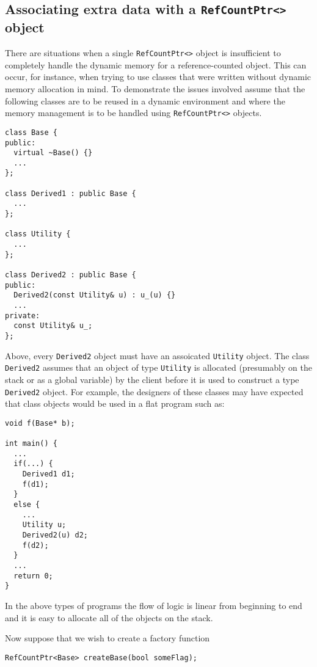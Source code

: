 %
\subsection{Associating extra data with a {}\texttt{RefCountPtr<>} object}
\label{rcp:sec:extra-data}
%

There are situations when a single {}\texttt{RefCountPtr<>} object is
insufficient to completely handle the dynamic memory for a
reference-counted object.  This can occur, for instance, when trying
to use classes that were written without dynamic memory allocation in
mind.  To demonstrate the issues involved assume that the following
classes are to be reused in a dynamic environment and where the memory
management is to be handled using {}\texttt{RefCountPtr<>} objects.

{\scriptsize\begin{verbatim}
class Base {
public:
  virtual ~Base() {}
  ...
};

class Derived1 : public Base {
  ...
};

class Utility {
  ...
};

class Derived2 : public Base {
public:
  Derived2(const Utility& u) : u_(u) {}
  ...
private:
  const Utility& u_;
};
\end{verbatim}}

{}\noindent{}Above, every {}\texttt{Derived2} object must have an
assoicated {}\texttt{Utility} object.  The class {}\texttt{Derived2}
assumes that an object of type {}\texttt{Utility} is allocated
(presumably on the stack or as a global variable) by the client before
it is used to construct a type {}\texttt{Derived2} object.  For
example, the designers of these classes may have expected that class
objects would be used in a flat program such as:

{\scriptsize\begin{verbatim}
void f(Base* b);

int main() {
  ...
  if(...) {
    Derived1 d1;
    f(d1);
  }
  else {
    ...
    Utility u;
    Derived2(u) d2;
    f(d2);
  }
  ...
  return 0;
}
\end{verbatim}}

{}\noindent{}In the above types of programs the flow of logic is
linear from beginning to end and it is easy to allocate all of the
objects on the stack.

Now suppose that we wish to create a factory function

{\scriptsize\begin{verbatim}
RefCountPtr<Base> createBase(bool someFlag);
\end{verbatim}}

